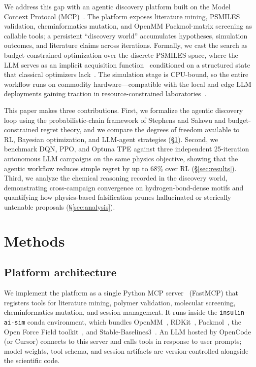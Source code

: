 \documentclass[twocolumn]{fairmeta}
\begin{document}
We address this gap with an agentic discovery platform built on the Model Context Protocol (MCP)~\cite{mcp2024}.
The platform exposes literature mining, PSMILES validation, cheminformatics mutation, and OpenMM Packmol-matrix screening as callable tools; a persistent ``discovery world'' accumulates hypotheses, simulation outcomes, and literature claims across iterations.
Formally, we cast the search as budget-constrained optimization over the discrete PSMILES space, where the LLM serves as an implicit acquisition function~\cite{yang2024opro} conditioned on a structured state that classical optimizers lack~\cite{shahriari2016bayesopt}.
The simulation stage is CPU-bound, so the entire workflow runs on commodity hardware---compatible with the local and edge LLM deployments gaining traction in resource-constrained laboratories~\cite{xu2024ondevice}.

This paper makes three contributions.
First, we formalize the agentic discovery loop using the probabilistic-chain framework of Stephens and Salawu and budget-constrained regret theory, and we compare the degrees of freedom available to RL, Bayesian optimization, and LLM-agent strategies (\S\ref{sec:methods}).
Second, we benchmark DQN, PPO, and Optuna TPE against three independent 25-iteration autonomous LLM campaigns on the same physics objective, showing that the agentic workflow reduces simple regret by up to 68\% over RL (\S\ref{sec:results}).
Third, we analyze the chemical reasoning recorded in the discovery world, demonstrating cross-campaign convergence on hydrogen-bond-dense motifs and quantifying how physics-based falsification prunes hallucinated or sterically untenable proposals (\S\ref{sec:analysis}).

\section{Methods}
\label{sec:methods}

\subsection{Platform architecture}

We implement the platform as a single Python MCP server~\cite{mcp2024} (FastMCP) that registers tools for literature mining, polymer validation, molecular screening, cheminformatics mutation, and session management.
It runs inside the \texttt{insulin-ai-sim} conda environment, which bundles OpenMM~\cite{eastman2017openmm}, RDKit~\cite{landrum2013rdkit}, Packmol~\cite{packmol2009}, the Open Force Field toolkit~\cite{qiu2021development}, and Stable-Baselines3~\cite{sb3_2021}.
An LLM hosted by OpenCode (or Cursor) connects to this server and calls tools in response to user prompts; model weights, tool schema, and session artifacts are version-controlled alongside the scientific code.
\end{document}
